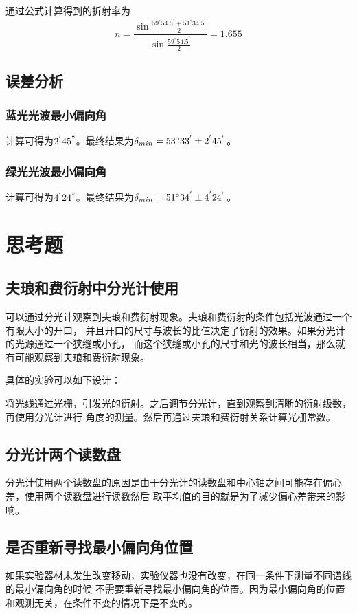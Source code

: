 \documentclass{ctexart}
\begin{document}
  通过公式计算得到的折射率为
  \begin{equation}
    n=\frac{\sin\frac{59^{\circ}54.5^{'}+51^{\circ}34.5^{'}}{2}}{\sin\frac{59^{\circ}54.5^{'}}{2}}=1.655
  \end{equation}

  \subsection{误差分析}
  \subsubsection{蓝光光波最小偏向角}
  计算可得为$2^{'}45^{"}$。最终结果为$\delta_{min}=53^{\circ}33^{'}\pm 2^{'}45^{"}$。
  \subsubsection{绿光光波最小偏向角}
  计算可得为$4^{'}24^{"}$。最终结果为$\delta_{min}=51^{\circ}34^{'}\pm 4^{'}24^{"}$。

\section{思考题}
  \subsection{夫琅和费衍射中分光计使用}
  可以通过分光计观察到夫琅和费衍射现象。夫琅和费衍射的条件包括光波通过一个有限大小的开口，
  并且开口的尺寸与波长的比值决定了衍射的效果。如果分光计的光源通过一个狭缝或小孔，
  而这个狭缝或小孔的尺寸和光的波长相当，那么就有可能观察到夫琅和费衍射现象。

  具体的实验可以如下设计：

  将光线通过光栅，引发光的衍射。之后调节分光计，直到观察到清晰的衍射级数，再使用分光计进行
  角度的测量。然后再通过夫琅和费衍射关系计算光栅常数。

  \subsection{分光计两个读数盘}
  分光计使用两个读数盘的原因是由于分光计的读数盘和中心轴之间可能存在偏心差，使用两个读数盘进行读数然后
  取平均值的目的就是为了减少偏心差带来的影响。

  \subsection{是否重新寻找最小偏向角位置}
  如果实验器材未发生改变移动，实验仪器也没有改变，在同一条件下测量不同谱线的最小偏向角的时候
  不需要重新寻找最小偏向角的位置。因为最小偏向角的位置和观测无关，在条件不变的情况下是不变的。
\end{document}
